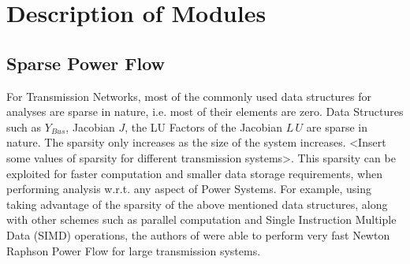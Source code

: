 \documentclass[varwidth]{standalone}
\begin{document}
\section{Description of Modules}

\subsection{Sparse Power Flow}
                    For Transmission Networks, most of the commonly used data structures for analyses are sparse in nature, i.e. most of their elements are zero. Data Structures such as $Y_{Bus}$, Jacobian $J$, the LU Factors of the Jacobian $L \, U$ are sparse in nature. The sparsity only increases as the size of the system increases. <Insert some values of sparsity for different transmission systems>. This sparsity can be exploited for faster computation and smaller data storage requirements, when performing analysis w.r.t. any aspect of Power Systems. For example, using taking advantage of the sparsity of the above mentioned data structures, along with other schemes such as parallel computation and Single Instruction Multiple Data (SIMD) operations, the authors of \cite{Ahmadi2021Sep} were able to perform very fast Newton Raphson Power Flow for large transmission systems.
\end{document}
